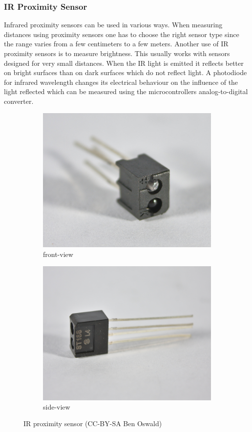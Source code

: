 \documentclass[11pt,a4paper]{article}
\begin{document}
\subsubsection{IR Proximity Sensor}
Infrared proximity sensors can be used in various ways. When measuring distances using proximity sensors one has to choose the right sensor type since the range varies from a few centimeters to a few meters. Another use of IR proximity sensors is to measure brightness. This usually works with sensors designed for very small distances. When the IR light is emitted it reflects better on bright surfaces than on dark surfaces which do not reflect light. A photodiode for infrared wavelength changes its electrical behaviour on the influence of the light reflected which can be measured using the microcontrollers analog-to-digital converter.

\begin{figure}[H]
  \centering
  \begin{subfigure}{0.48\textwidth}
  \centering
  \includegraphics[width=0.9\linewidth]{images/30_proximity_front.jpg}
  \caption{front-view}
  \end{subfigure}
  \begin{subfigure}{0.48\textwidth}
  \centering
  \includegraphics[width=0.9\linewidth]{images/30_proximity_back.jpg}
  \caption{side-view}
  \end{subfigure}
  \caption{IR proximity sensor (CC-BY-SA Ben Oswald)}
\end{figure}
\end{document}
